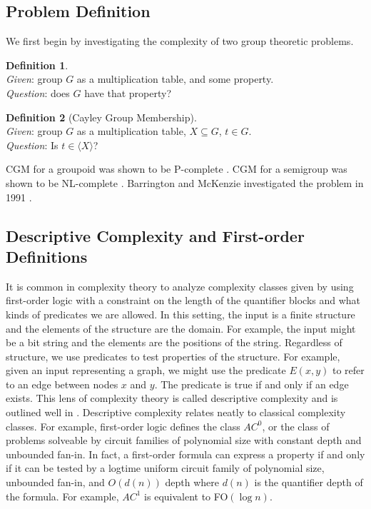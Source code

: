 \documentclass[a4paper,12pt]{article}
\theoremstyle{plain}
\theoremstyle{definition}
\newtheorem{defn}{Definition}
\theoremstyle{remark}
\begin{document}
\subsection{Problem Definition}
We first begin by investigating the complexity of two group theoretic problems.
\begin{defn}
  ~\\
  \textit{Given}: group $G$ as a multiplication table, and some property. \\
  \textit{Question}: does $G$ have that property?
\end{defn}
\begin{defn}[Cayley Group Membership]
  ~\\
  \textit{Given}: group $G$ as a multiplication table, $X\subseteq G$, $t\in G$. \\
  \textit{Question}: Is $t\in\langle X\rangle$?
\end{defn}
CGM for a groupoid was shown to be P-complete \cite{10.1145/800119.803883}. CGM for a semigroup was shown to be NL-complete \cite{Jones1976}. Barrington and McKenzie investigated the problem in 1991 \cite{Barrington1991}.

\subsection{Descriptive Complexity and First-order Definitions}
It is common in complexity theory to analyze complexity classes given by using first-order logic with a constraint on the length of the quantifier blocks and what kinds of predicates we are allowed. In this setting, the input is a finite structure and the elements of the structure are the domain. For example, the input might be a bit string and the elements are the positions of the string. Regardless of structure, we use predicates to test properties of the structure. For example, given an input representing a graph, we might use the predicate $E(x,y)$ to refer to an edge between nodes $x$ and $y$. The predicate is true if and only if an edge exists. This lens of complexity theory is called descriptive complexity and is outlined well in \cite{Immerman1998-wm}. Descriptive complexity relates neatly to classical complexity classes. For example, first-order logic defines the class $AC^0$, or the class of problems solveable by circuit families of polynomial size with constant depth and unbounded fan-in. In fact, a first-order formula can express a property if and only if it can be tested by a logtime uniform circuit family of polynomial size, unbounded fan-in, and $O(d(n))$ depth where $d(n)$ is the quantifier depth of the formula. For example, $AC^1$ is equivalent to FO$(\log n)$. 
\end{document}
